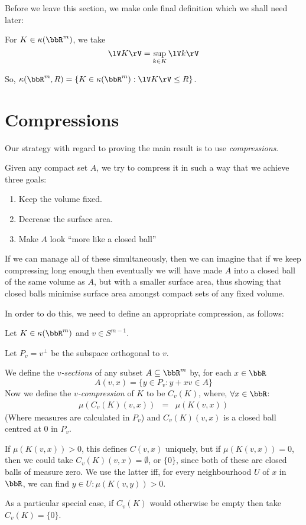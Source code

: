 \documentclass[a4paper,11pt]{article}
\begin{document}
Before we leave this section, we make onle final definition which we shall need
later:

\begin{defn}
For $K\in\kappa(\bbR^m)$, we take
\[
\lV K\rV=\sup_{k\in K}\lV k\rV
\]
\end{defn}

So, $\kappa(\bbR^m,R)=\{K\in\kappa(\bbR^m):\lV K\rV\leq R\}$.

\section{Compressions}
Our strategy with regard to proving the main result is to use
\emph{compressions}.

Given any compact set $A$, we try to compress it in such a way that we achieve
three goals:
\begin{enumerate}
\item Keep the volume fixed.
\item Decrease the surface area.
\item Make $A$ look ``more like a closed ball''
\end{enumerate}
If we can manage all of these simultaneously, then we can imagine that if we
keep compressing long enough then eventually we will have made $A$ into a
closed ball of the same volume as $A$, but with a smaller surface area, thus
showing that closed balls minimise surface area amongst compact sets of any
fixed volume.

In order to do this, we need to define an appropriate compression, as follows:

\begin{defn}
\label{defn:compression}
Let $K\in\kappa(\bbR^m)$ and $v\in S^{m-1}$.

Let $P_v=v^\perp$ be the subspace orthogonal to $v$.

We define the \emph{$v$-sections} of any subset $A\subseteq\bbR^m$ by,
for each $x\in\bbR$
\[
A(v,x)=\{y\in P_v:y+xv\in A\}
\]
Now we define the \emph{$v$-compression} of $K$ to be $C_v(K)$, where,
$\forall x\in\bbR$:
%
\begin{eqnarray*}
\mu(C_v(K)(v,x))&=&\mu(K(v,x))
\end{eqnarray*}
%
(Where measures are calculated in $P_v$)
and $C_v(K)(v,x)$ is a closed ball centred at $0$ in $P_v$.

If $\mu(K(v,x))>0$, this defines $C(v,x)$ uniquely, but if $\mu(K(v,x))=0$,
then we could take $C_v(K)(v,x)=\emptyset$, or $\{0\}$, since both of these are
closed balls of measure zero.  We use the latter iff, for every neighbourhood
$U$ of $x$ in $\bbR$, we can find $y\in U:\mu(K(v,y))>0$.

As a particular special case, if $C_v(K)$ would otherwise be empty then take
$C_v(K)=\{0\}$.
\end{defn}
\end{document}

